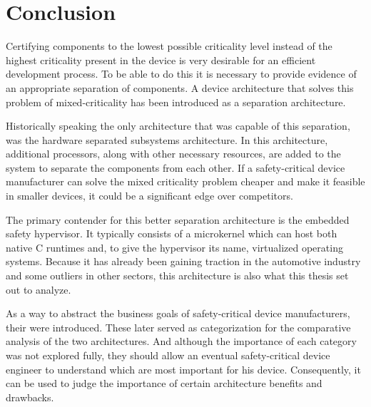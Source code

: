 
\section{Conclusion}
Certifying components to the lowest possible criticality level instead of the highest criticality present in the device is very desirable for an efficient development process. To be able to do this it is necessary to provide evidence of an appropriate separation of components. A device architecture that solves this problem of mixed-criticality has been introduced as a separation architecture.

Historically speaking the only architecture that was capable of this separation, was the hardware separated subsystems architecture. In this architecture, additional processors, along with other necessary resources, are added to the system to separate the components from each other. If a safety-critical device manufacturer can solve the mixed criticality problem cheaper and make it feasible in smaller devices, it could be a significant edge over competitors.

The primary contender for this better separation architecture is the embedded safety hypervisor. It typically consists of a microkernel which can host both native C runtimes and, to give the hypervisor its name, virtualized operating systems. Because it has already been gaining traction in the automotive industry and some outliers in other sectors, this architecture is also what this thesis set out to analyze.

As a way to abstract the business goals of safety-critical device manufacturers, their  were introduced. These later served as categorization for the comparative analysis of the two architectures. And although the importance of each category was not explored fully, they should allow an eventual safety-critical device engineer to understand which are most important for his device. Consequently, it can be used to judge the importance of certain architecture benefits and drawbacks.

